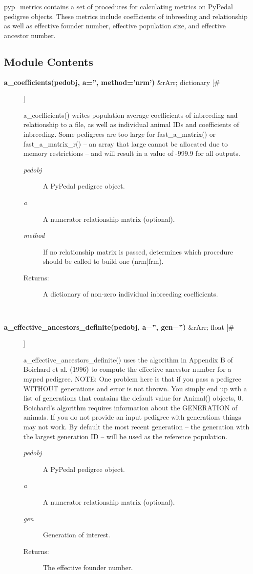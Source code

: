 

 pyp\_metrics contains a set of procedures for calculating metrics on PyPedal pedigree objects. These metrics include coefficients of inbreeding and relationship as well as effective founder number, effective population size, and effective ancestor number.
\subsection*{Module Contents}
\begin{description}
\item[\textbf{a\_coefficients(pedobj, a='', method='nrm')}
 \&rArr; dictionary [\#]]

 a\_coefficients() writes population average coefficients of inbreeding and relationship to a file, as well as individual animal IDs and coefficients of inbreeding. Some pedigrees are too large for fast\_a\_matrix() or fast\_a\_matrix\_r() -- an array that large cannot be allocated due to memory restrictions -- and will result in a value of -999.9 for all outputs.
\begin{description}
\item[\emph{pedobj}
] A PyPedal pedigree object.
\item[\emph{a}
] A numerator relationship matrix (optional).
\item[\emph{method}
] If no relationship matrix is passed, determines which procedure should be called to build one (nrm|frm).
\item[Returns:] A dictionary of non-zero individual inbreeding coefficients.

\end{description}
\\ 

\item[\textbf{a\_effective\_ancestors\_definite(pedobj, a='', gen='')}
 \&rArr; float [\#]]

 a\_effective\_ancestors\_definite() uses the algorithm in Appendix B of Boichard et al. (1996) to compute the effective ancestor number for a myped pedigree. NOTE: One problem here is that if you pass a pedigree WITHOUT generations and error is not thrown. You simply end up wth a list of generations that contains the default value for Animal() objects, 0. Boichard's algorithm requires information about the GENERATION of animals. If you do not provide an input pedigree with generations things may not work. By default the most recent generation -- the generation with the largest generation ID -- will be used as the reference population.
\begin{description}
\item[\emph{pedobj}
] A PyPedal pedigree object.
\item[\emph{a}
] A numerator relationship matrix (optional).
\item[\emph{gen}
] Generation of interest.
\item[Returns:] The effective founder number.


\end{description}
\end{description}
